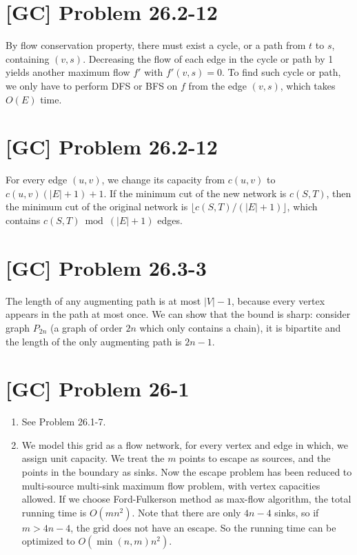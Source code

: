 \documentclass[a4paper,11pt,twocolumn]{article}
\begin{document}
  \section{[GC] Problem 26.2-12}
  By flow conservation property, there must exist a cycle, or a path from $t$ to $s$, containing $(v, s)$. Decreasing the flow of each edge in the cycle or path by 1 yields another maximum flow $f'$ with $f'(v, s) = 0$. To find such cycle or path, we only have to perform DFS or BFS on $f$ from the edge $(v, s)$, which takes $O(E)$ time.

  \section{[GC] Problem 26.2-12}
  For every edge $(u, v)$, we change its capacity from $c(u, v)$ to $c(u, v)(|E|+1)+1$. If the minimum cut of the new network is $c(S, T)$, then the minimum cut of the original network is $\lfloor c(S, T) / (|E|+1) \rfloor$, which contains $c(S, T) \bmod (|E|+1)$ edges.

  \section{[GC] Problem 26.3-3}
  The length of any augmenting path is at most $|V|-1$, because every vertex appears in the path at most once. We can show that the bound is sharp: consider graph $P_{2n}$ (a graph of order $2n$ which only contains a chain), it is bipartite and the length of the only augmenting path is $2n-1$.

  \section{[GC] Problem 26-1}
  \begin{enumerate}
    \item See Problem 26.1-7.
    \item We model this grid as a flow network, for every vertex and edge in which, we assign unit capacity. We treat the $m$ points to escape as sources, and the points in the boundary as sinks. Now the escape problem has been reduced to multi-source multi-sink maximum flow problem, with vertex capacities allowed. If we choose Ford-Fulkerson method as max-flow algorithm, the total running time is $O(mn^2)$. Note that there are only $4n-4$ sinks, so if $m > 4n-4$, the grid does not have an escape. So the running time can be optimized to $O(\min(n, m)n^2)$.
  \end{enumerate}
\end{document}

